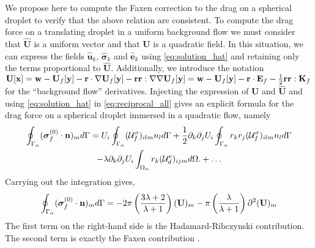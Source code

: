 We propose here to compute the Faxen correction to the drag on a spherical droplet to verify that the above relation are consistent. 
To compute the drag force on a translating droplet in a uniform background flow we must consider that  $\hat{\textbf{U}}$ is a uniform vector and that  ${\textbf{U}}$ is a quadratic field. 
In this situation, we can express the fields $\hat{\textbf{u}}_k$, $\hat{\bm\sigma}_k$ and $\hat{\textbf{e}}_k$ using \ref{eq:solution_hat} and retaining only the terms proportional to $\hat{\textbf{U}}$. 
Additionally, we introduce the notation $\textbf{U}[\textbf{x}] = \textbf{w} - \textbf{U}_f[\textbf{y}] - \textbf{r}\cdot \mathbf{\nabla} \textbf{U}_f[\textbf{y}] - \textbf{rr}:\mathbf{\nabla}\mathbf{\nabla} \textbf{U}_f[\textbf{y}] =  \textbf{w} - \textbf{U}_f[\textbf{y}] - \textbf{r}\cdot \textbf{E}_f - \frac{1}{2}\textbf{rr}: \textbf{K}_f $ for the ``background flow'' derivatives.
Injecting the expression of \textbf{U} and $\hat{\textbf{U}}$ and using \ref{eq:solution_hat} in \ref{eq:reciprocal_all} gives an explicit formula for the drag force on a spherical droplet immersed in a quadratic flow, namely
\begin{multline}
\intS{(\bm\sigma_f^{(0)} \cdot \textbf{n})_m}
    = 
    U_i  \intS{  (\mathcal{U}_f^\sigma)_{ilm}  n_l }
    + \frac{1}{2}\partial_k\partial_j U_i \intS{ r_kr_j (\mathcal{U}_f^\sigma)_{ilm}  n_l }\\
    -\lambda \partial_k\partial_j U_i  \intO{ r_k (\mathcal{U}_d^e)_{ijm} }. 
    + \ldots
    \label{eq:reciprocal_drag}
\end{multline}
Carrying out the integration gives,
\begin{align*}
\oint_{\Gamma_{\alpha}} (\bm\sigma_f^{(0)} \cdot \textbf{n})_m d\Gamma
    = 
    - 2\pi\left(\frac{3\lambda +2 }{\lambda +1}\right)
    (\textbf{U}  )_m
    - \pi \left(\frac{\lambda }{\lambda +1}\right)\partial^2 (\textbf{U})_m
\end{align*}
The first term on the right-hand side is the Hadamard-Ribczynski contribution. 
The second term is exactly the Faxen contribution \citep{kim2013microhydrodynamics}. 

